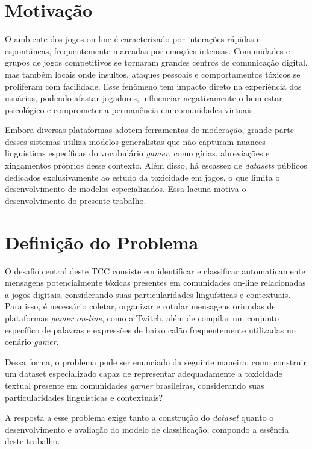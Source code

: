 \documentclass{eic-bcc-tcc}
\begin{document}
\section{Motivação}

O ambiente dos jogos on-line é caracterizado por interações rápidas e espontâneas, frequentemente marcadas por emoções intensas. Comunidades e grupos de jogos competitivos se tornaram grandes centros de comunicação digital, mas também locais onde insultos, ataques pessoais e comportamentos tóxicos se proliferam com facilidade. Esse fenômeno tem impacto direto na experiência dos usuários, podendo afastar jogadores, influenciar negativamente o bem-estar psicológico e comprometer a permanência em comunidades virtuais.

Embora diversas plataformas adotem ferramentas de moderação, grande parte desses sistemas utiliza modelos generalistas que não capturam nuances linguísticas específicas do vocabulário \textit{gamer}, como gírias, abreviações e xingamentos próprios desse contexto. Além disso, há escassez de \textit{datasets} públicos dedicados exclusivamente ao estudo da toxicidade em jogos, o que limita o desenvolvimento de modelos especializados. Essa lacuna motiva o desenvolvimento do presente trabalho.

\section{Definição do Problema}

O desafio central deste TCC consiste em identificar e classificar automaticamente mensagens potencialmente tóxicas presentes em comunidades on-line relacionadas a jogos digitais, considerando suas particularidades linguísticas e contextuais. Para isso, é necessário coletar, organizar e rotular mensagens oriundas de plataformas \textit{gamer} \textit{on-line}, como a Twitch, além de compilar um conjunto específico de palavras e expressões de baixo calão frequentemente utilizadas no cenário \textit{gamer}.

Dessa forma, o problema pode ser enunciado da seguinte maneira: como construir um dataset especializado capaz de representar adequadamente a toxicidade textual presente em comunidades \textit{gamer} brasileiras, considerando suas particularidades linguísticas e contextuais?

A resposta a esse problema exige tanto a construção do \textit{dataset} quanto o desenvolvimento e avaliação do modelo de classificação, compondo a essência deste trabalho.
\end{document}
